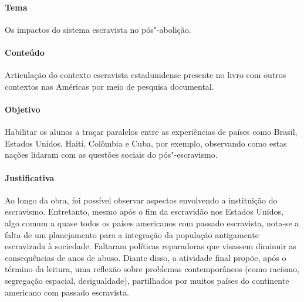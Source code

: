 \documentclass[12pt]{extarticle}
\begin{document}
 \paragraph{Tema} Os impactos do sistema escravista no pós"-abolição.

 \paragraph{Conteúdo} Articulação do contexto escravista estadunidense presente
 no livro com outros contextos nas Américas por meio de pesquisa documental.

 \paragraph{Objetivo} Habilitar os alunos a traçar paralelos entre as experiências
 de países como Brasil, Estados Unidos, Haiti, Colômbia e Cuba, por exemplo,
 observando como estas nações lidaram com as questões sociais do pós"-escravismo.

 \paragraph{Justificativa} Ao longo da obra, foi possível observar aspectos envolvendo
a instituição do escravismo. Entretanto, mesmo após o fim da escravidão
nos Estados Unidos, algo comum a quase todos os países americanos com
passado escravista, nota-se a falta de um planejamento para a integração
da população antigamente escravizada à sociedade. Faltaram políticas
reparadoras que visassem diminuir as consequências de anos de abuso.
Diante disso, a atividade final propõe, após o término da leitura, uma
reflexão sobre problemas contemporâneos (como racismo, segregação
espacial, desigualdade), partilhados por muitos países do continente americano com
passado escravista. 
\end{document}
